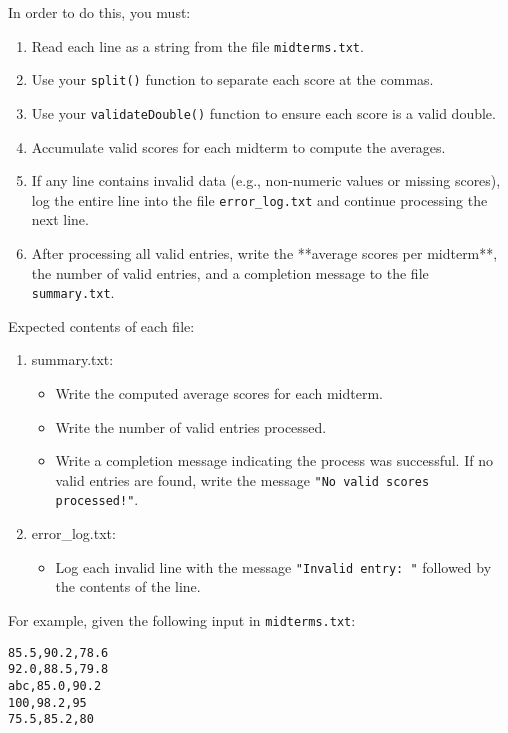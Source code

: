 In order to do this, you must:
\begin{enumerate}
\item  Read each line as a string from the file \texttt{midterms.txt}.  
\item  Use your \texttt{split()} function to separate each score at the commas.  
\item  Use your \texttt{validateDouble()} function to ensure each score is a valid double.  
\item  Accumulate valid scores for each midterm to compute the averages.  
\item  If any line contains invalid data (e.g., non-numeric values or missing scores), log the entire line into the file \texttt{error_log.txt} and continue processing the next line.  
\item  After processing all valid entries, write the **average scores per midterm**, the number of valid entries, and a completion message to the file \texttt{summary.txt}.
\end{enumerate}

Expected contents of each file:
\begin{enumerate}
\item summary.txt:
    \begin{itemize}
    \item Write the computed average scores for each midterm.
    \item Write the number of valid entries processed.
    \item Write a completion message indicating the process was successful. If no valid entries are found, write the message \texttt{"No valid scores processed!"}.
    \end{itemize}
    
\item error\_log.txt:
    \begin{itemize}
    \item Log each invalid line with the message \texttt{"Invalid entry: "} followed by the contents of the line.
    \end{itemize}
\end{enumerate}

For example, given the following input in \texttt{midterms.txt}:

\begin{verbatim}
85.5,90.2,78.6
92.0,88.5,79.8
abc,85.0,90.2
100,98.2,95
75.5,85.2,80
\end{verbatim}

